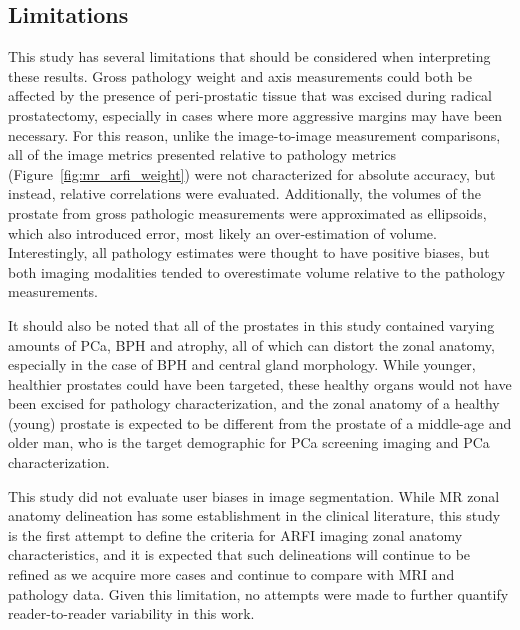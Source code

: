 \subsection{Limitations}
This study has several limitations that should be considered when interpreting
these results.  Gross pathology weight and axis measurements could both be
affected by the presence of peri-prostatic tissue that was excised during
radical prostatectomy, especially in cases where more aggressive margins may
have been necessary.  For this reason, unlike the image-to-image measurement
comparisons, all of the image metrics presented relative to pathology metrics
(Figure~\ref{fig:mr_arfi_weight}) were not characterized for absolute accuracy,
but instead, relative correlations were evaluated.  Additionally, the volumes
of the prostate from gross pathologic measurements were approximated as
ellipsoids, which also introduced error, most likely an over-estimation of
volume.  Interestingly, all pathology estimates were thought to have positive
biases, but both imaging modalities tended to overestimate volume relative to
the pathology measurements.

It should also be noted that all of the prostates in this study contained
varying amounts of PCa, BPH and atrophy, all of which can distort the zonal
anatomy, especially in the case of BPH and central gland morphology.  While
younger, healthier prostates could have been targeted, these healthy organs
would not have been excised for pathology characterization, and the zonal
anatomy of a healthy (young) prostate is expected to be different from the
prostate of a middle-age and older man, who is the target demographic for PCa screening
imaging and PCa characterization. 

This study did not evaluate user biases in image segmentation.  While MR zonal
anatomy delineation has some establishment in the clinical literature, this
study is the first attempt to define the criteria for ARFI imaging zonal
anatomy characteristics, and it is expected that such delineations will
continue to be refined as we acquire more cases and continue to compare with
MRI and pathology data.  Given this limitation, no attempts were made to
further quantify reader-to-reader variability in this work.
